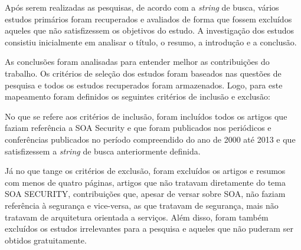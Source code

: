Após serem realizadas as pesquisas, de acordo com a \emph{string} de busca,  vários estudos primários foram recuperados e avaliados  de forma que fossem  excluídos aqueles que não satisfizessem os objetivos do estudo. A investigação dos estudos consistiu inicialmente em analisar o título, o resumo, a introdução e a conclusão.

As conclusões foram analisadas para entender melhor as contribuições do trabalho. Os critérios de seleção dos estudos foram baseados nas questões de pesquisa e todos os estudos recuperados foram armazenados. Logo, para este mapeamento foram definidos os seguintes critérios de inclusão e exclusão:

No que se refere aos critérios de inclusão, foram incluídos todos os artigos que faziam referência a SOA Security e que foram publicados nos periódicos e conferências publicados no período compreendido do ano de 2000 até 2013 e que satisfizessem a \emph{string} de busca anteriormente definida.

Já no que tange os critérios de exclusão, foram excluídos os artigos e resumos com menos de quatro páginas, artigos que não tratavam diretamente do tema SOA SECURITY, contribuições que, apesar de versar sobre SOA, não faziam referência à segurança e vice-versa, as que tratavam de segurança, mais não tratavam de arquitetura orientada a serviços. Além disso, foram também excluídos os estudos irrelevantes para a pesquisa e aqueles que não puderam ser obtidos gratuitamente.





